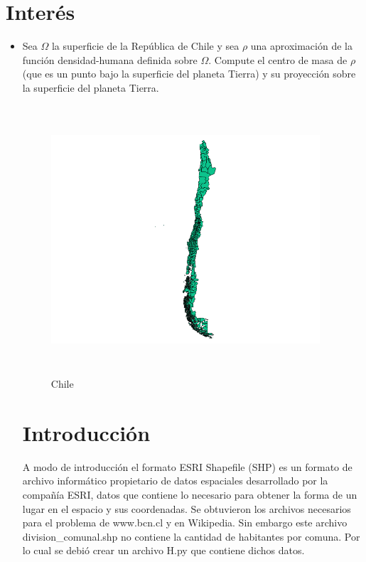 \documentclass[20pt]{report}
\begin{document}
\section{ Inter\'es}
\begin{itemize}
\item Sea $\Omega$ la superficie de la Rep\'ublica de Chile y sea $\rho$ una aproximaci\'on de la funci\'on densidad-humana definida sobre $\Omega$. Compute el centro de masa de $\rho$ (que es un punto bajo la superficie del planeta Tierra) y su proyecci\'on sobre la superficie del planeta Tierra.
\\


\begin{figure}[H]
\begin{center}
\includegraphics[width=10cm, height=10cm]{chile.png}
\vspace{-0.5cm} %
\caption{Chile}
\label{Label para referencia}
\end{center}
\end{figure}
\pagebreak
\label{cap.introduccion}\section{Introducci\'on}

A modo de introducci\'on el formato ESRI Shapefile (SHP) es un formato de archivo inform\'atico propietario de datos espaciales desarrollado por la compa\~n\'ia ESRI, datos que contiene  lo necesario para obtener la forma de un lugar en el espacio y sus coordenadas. Se obtuvieron los archivos necesarios para el problema de  www.bcn.cl  y en Wikipedia. Sin embargo este archivo division\_comunal.shp no contiene la cantidad de habitantes   por comuna. Por lo cual se debi\'o crear un archivo H.py que contiene  dichos datos. \\


\end{itemize}
\end{document}
